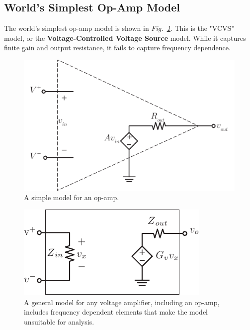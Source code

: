 \subsection{World's Simplest Op-Amp Model}
The world's simplest op-amp model is shown in \emph{Fig.~\ref{fig:opamp_model}}. This is the "VCVS'' model, or the \textbf{Voltage-Controlled Voltage Source} model.  While it captures finite gain and output resistance, it fails to capture frequency dependence.
\vspace{0.5cm}
\begin{figure}[H]
\centering
\includegraphics[scale=1.25]{opamp_model}
\caption{A simple model for an op-amp.}
\label{fig:opamp_model}
\end{figure}
\newpage
\begin{figure}[t]
\centering
\includegraphics[scale=1.35]{vampmodelz}
\caption{A general model for any voltage amplifier, including an op-amp, includes frequency dependent elements that make the model unsuitable for analysis.}
\label{fig:vampmodelz}
\end{figure}
